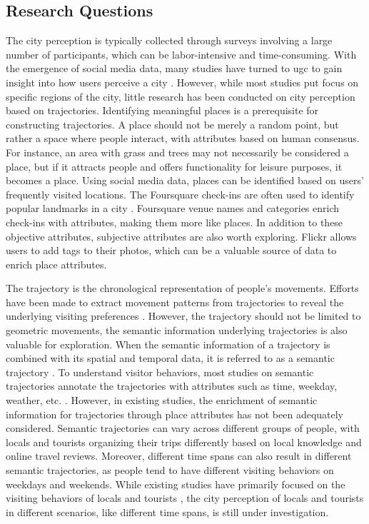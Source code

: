 \documentclass{article}
\begin{document}
\subsection{Research Questions}
The city perception is typically collected through surveys involving a large number of participants, which can be labor-intensive and time-consuming. With the emergence of social media data, many studies have turned to \acrshort{ugc} to gain insight into how users perceive a city \citep{cranshaw_livehoods_2021,huang_user_2022}. However, while most studies put focus on specific regions of the city, little research has been conducted on city perception based on trajectories. Identifying meaningful places is a prerequisite for constructing trajectories. A place should not be merely a random point, but rather a space where people interact, with attributes based on human consensus. For instance, an area with grass and trees may not necessarily be considered a place, but if it attracts people and offers functionality for leisure purposes, it becomes a place. Using social media data, places can be identified based on users’ frequently visited locations. The Foursquare check-ins are often used to identify popular landmarks in a city \citep{ferreira_beyond_2015,ferreira_uncovering_2020,santos_uncovering_2018}. Foursquare venue names and categories enrich check-ins with attributes, making them more like places. In addition to these objective attributes, subjective attributes are also worth exploring. Flickr allows users to add tags to their photos, which can be a valuable source of data to enrich place attributes.

The trajectory is the chronological representation of people’s movements. Efforts have been made to extract movement patterns from trajectories to reveal the underlying visiting preferences \citep{vu_discovering_2019}. However, the trajectory should not be limited to geometric movements, the semantic information underlying trajectories is also valuable for exploration. When the semantic information of a trajectory is combined with its spatial and temporal data, it is referred to as a semantic trajectory \citep{yan_semantic_2011}. To understand visitor behaviors, most studies on semantic trajectories annotate the trajectories with attributes such as time, weekday, weather, etc. \citep{cai_mining_2018,petry_towards_2019}. However, in existing studies, the enrichment of semantic information for trajectories through place attributes has not been adequately considered. Semantic trajectories can vary across different groups of people, with locals and tourists organizing their trips differently based on local knowledge and online travel reviews. Moreover, different time spans can also result in different semantic trajectories, as people tend to have different visiting behaviors on weekdays and weekends. While existing studies have primarily focused on the visiting behaviors of locals and tourists \citep{domenech_using_2020,straumann_towards_2014}, the city perception of locals and tourists in different scenarios, like different time spans, is still under investigation.
\end{document}
